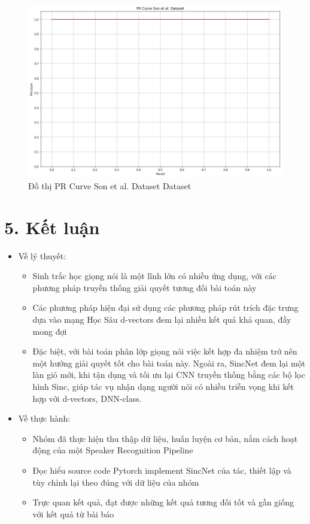 \documentclass{article}
\begin{document}
	\begin{figure}[H]
		\centering
		\includegraphics[width=.75\textwidth]{result/pr_curve_vietnamese.png}
		\caption{Đồ thị PR Curve Son et al. Dataset Dataset}
		\label{fig:writing-thesis}
	\end{figure}
	\section{5. Kết luận}
	\begin{itemize}
		\item Về lý thuyết:
		\begin{itemize}
			\item Sinh trắc học giọng nói là một lĩnh lớn có nhiều ứng dụng, với các phương pháp truyền thống giải quyết tương đối bài toán này
			\item Các phương pháp hiện đại sử dụng các phương pháp rút trích đặc trưng dựa vào mạng Học Sâu d-vectors đem lại nhiều kết quả khả quan, đầy mong đợi
			\item Đặc biệt, với bài toán phân lớp giọng nói việc kết hợp đa nhiệm trở nên một hướng giải quyết tốt cho bài toán này. Ngoài ra, SincNet đem lại một làn gió mới, khi tận dụng và tối ưu lại CNN truyền thống bằng các bộ lọc hình Sinc, giúp tác vụ nhận dạng người nói có nhiều triễn vọng khi kết hợp với d-vectors, DNN-class.
		\end{itemize} 
		\item Về thực hành:
		\begin{itemize}
			\item Nhóm đã thực hiện thu thập dữ liệu, huấn luyện cơ bản, nắm cách hoạt động của một Speaker Recognition Pipeline
			\item Đọc hiểu source code Pytorch implement SincNet của tác, thiết lập và tùy chỉnh lại theo đúng với dữ liệu của nhóm
			\item Trực quan kết quả, đạt được những kết quả tương đối tốt và gần giống với kết quả từ bài báo
		\end{itemize}
	\end{itemize}
\end{document}
